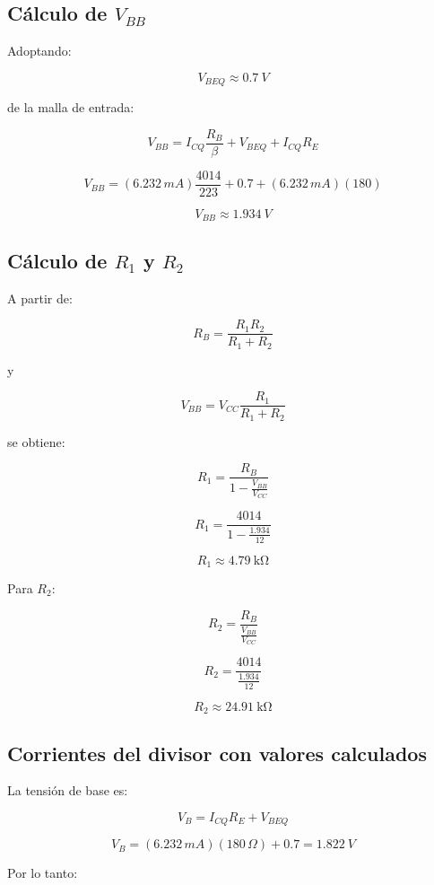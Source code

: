 \documentclass[a4paper,12pt]{article}
\begin{document}
\subsection{Cálculo de $V_{BB}$}

Adoptando:

\[
V_{BEQ}\approx\SI{0.7}{V}
\]

de la malla de entrada:

\[
V_{BB}
=
I_{CQ}\frac{R_B}{\beta}
+
V_{BEQ}
+
I_{CQ}R_E
\]

\[
V_{BB}
=
(6.232\,mA)\frac{4014}{223}
+
0.7
+
(6.232\,mA)(180)
\]

\[
\boxed{V_{BB}\approx\SI{1.934}{V}}
\]

\subsection{Cálculo de $R_1$ y $R_2$}

A partir de:

\[
R_B=\frac{R_1R_2}{R_1+R_2}
\]

y

\[
V_{BB}=V_{CC}\frac{R_1}{R_1+R_2}
\]

se obtiene:

\[
R_1
=
\frac{R_B}
{1-\frac{V_{BB}}{V_{CC}}}
\]

\[
R_1
=
\frac{4014}
{1-\frac{1.934}{12}}
\]

\[
\boxed{R_1\approx\SI{4.79}{\kilo\ohm}}
\]

Para $R_2$:

\[
R_2
=
\frac{R_B}
{\frac{V_{BB}}{V_{CC}}}
\]

\[
R_2
=
\frac{4014}
{\frac{1.934}{12}}
\]

\[
\boxed{R_2\approx\SI{24.91}{\kilo\ohm}}
\]

\subsection{Corrientes del divisor con valores calculados}

La tensión de base es:

\[
V_B
=
I_{CQ}R_E+V_{BEQ}
\]

\[
V_B
=
(6.232\,mA)(180\,\Omega)+0.7
=
\boxed{\SI{1.822}{V}}
\]

Por lo tanto:
\end{document}
